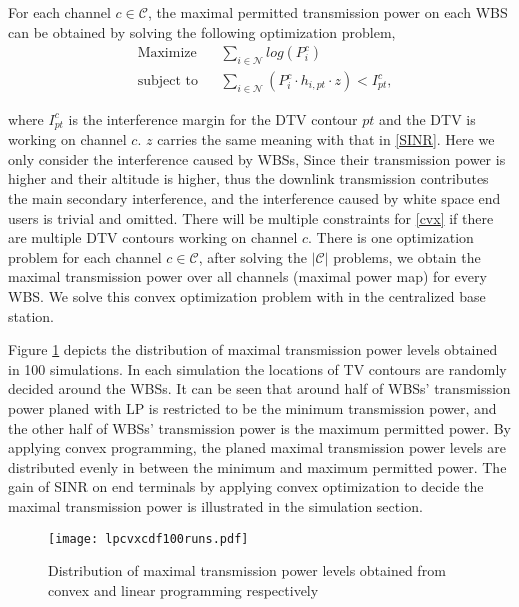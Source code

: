 For each channel $c\in \mathcal{C}$, the maximal permitted transmission power on each WBS can be obtained by solving the following optimization problem,
	\begin{equation}
\label{cvx}
		\begin{aligned}
		& {\text{Maximize}}
		& & \sum_{i\in \mathcal{N}} log(P^c_i) \\
		& \text{subject to}
		& & \sum_{i\in \mathcal{N}} (P^c_i \cdot h_{i,pt}\cdot z) < I^c_{pt}, 
		\end{aligned}
	\end{equation}

where $I^c_{pt}$ is the interference margin for the DTV contour $pt$ and the DTV is working on channel $c$. $z$ carries the same meaning with that in \ref{SINR}.
Here we only consider the interference caused by WBSs, Since their transmission power is higher and their altitude is higher\cite{multipleIntf_pimrc11}, thus the downlink transmission contributes the main secondary interference\cite{infmitigate07mobicom}, and the interference caused by white space end users is trivial and omitted. There will be multiple constraints for \ref{cvx} if there are multiple DTV contours working on channel $c$. There is one optimization problem for each channel $c\in \mathcal{C}$, after solving the $|\mathcal{C}|$ problems, we obtain the maximal transmission power over all channels (maximal power map) for every WBS. We solve this convex optimization problem with \cite{cvx} in the centralized base station.

Figure \ref{lpcvx} depicts the distribution of maximal transmission power levels obtained in 100 simulations. In each simulation the locations of TV contours are randomly decided around the WBSs. It can be seen that around half of WBSs' transmission power planed with LP is restricted to be the minimum transmission power, and the other half of WBSs' transmission power is the maximum permitted power. By applying convex programming, the planed maximal transmission power levels are distributed evenly in between the minimum and maximum permitted power. The gain of SINR on end terminals by applying convex optimization to decide the maximal transmission power is illustrated in the simulation section.

\begin{figure}[h!]
  \centering
  \texttt{[image: lpcvxcdf100runs.pdf]}
  \caption{Distribution of maximal transmission power levels obtained from convex and linear programming respectively}
\label{lpcvx}
\end{figure}


